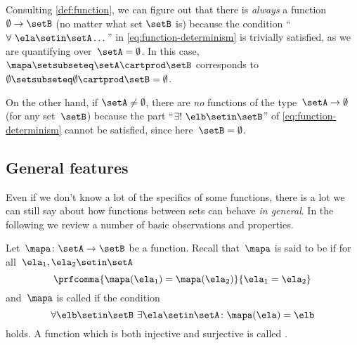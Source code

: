 Consulting \cref{def:function}, we can figure out that there is \emph{always} a function $\emptyset \to \setB$ (no matter what set $\setB$ is) because the condition ``$\forall \ \ela \setin\setA \dots$'' in \cref{eq:function-determinism} is trivially satisfied, as we are quantifying over~$\setA = \emptyset$. In this case,~$\mapa \setsubseteq \setA \cartprod \setB$ corresponds to~$\emptyset \setsubseteq \emptyset \cartprod \setB = \emptyset$.


On the other hand, if $\setA \neq \emptyset$, there are \emph{no} functions of the type~$\setA \to \emptyset$ (for any set~$\setB$) because the part ``$\exists ! \ \elb \setin\setB$'' of \cref{eq:function-determinism} cannot be satisfied, since here~$\setB = \emptyset$.



\subsection{General features}

Even if we don't know a lot of the specifics of some functions, there is a lot we can still say about how functions between sets can behave \emph{in general}.
In the following we review a number of basic observations and properties.

Let~$\mapa\colon \setA \to \setB$ be a function.
Recall that~$\mapa$ is said to be \emph{} if for all~$\ela_1, \ela_2 \setin\setA$
\begin{equation}
    \label{eq:injectivity-cond}
    \prfcomma{\mapa(\ela_1) = \mapa(\ela_2)}{\ela_1 = \ela_2}
\end{equation}
and~$\mapa$ is called \emph{} if the condition
\begin{equation}
    \label{eq:surjectivity-cond}
    \forall \elb \setin\setB \ \exists  \ela \setin\setA \colon \mapa(\ela) = \elb
\end{equation}
holds.
A function which is both injective and surjective is called \emph{}.

